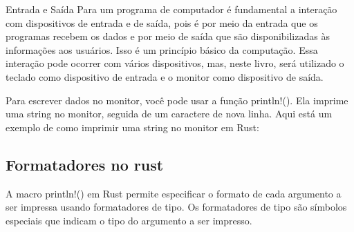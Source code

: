 \documentclass[12pt,a4paper,oneside]{abntex2}
\begin{document}
Entrada e Saída Para um programa de computador é fundamental a interação com dispositivos de entrada e de saída, pois é por meio da entrada que os programas recebem os dados e por meio de saída que são disponibilizadas às informações aos usuários. Isso é um princípio básico da computação. Essa interação pode ocorrer com vários dispositivos, mas, neste livro, será utilizado o teclado como dispositivo de entrada e o monitor como dispositivo de saída. 


%



Para escrever dados no monitor, você pode usar a função println!(). Ela imprime uma string no monitor, seguida de um caractere de nova linha. Aqui está um exemplo de como imprimir uma string no monitor em Rust:

%

\subsection{Formatadores no rust} 
A macro println!() em Rust permite especificar o formato de cada argumento a ser impressa usando formatadores de tipo. Os formatadores de tipo são símbolos especiais que indicam o tipo do argumento a ser impresso.
\end{document}
